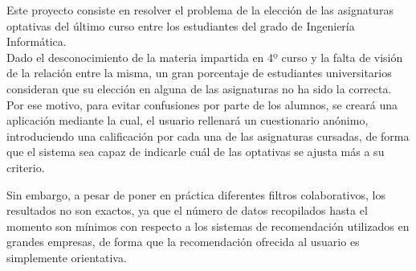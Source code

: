 \newcommand{\grad}{$^{\circ}$}
\nonzeroparskip
Este proyecto consiste en resolver el problema de la elección de las asignaturas optativas del último curso entre los estudiantes del grado de Ingeniería Informática. \\

Dado el desconocimiento de la materia impartida en 4º curso y la falta de visión de la relación entre la misma, un gran porcentaje de estudiantes universitarios consideran que su elección en alguna de las asignaturas no ha sido la correcta. \\

Por ese motivo, para evitar confusiones por parte de los alumnos, se creará una aplicación mediante la cual, el usuario rellenará un  cuestionario anónimo, introduciendo  una calificación por cada una de las asignaturas cursadas, de forma que el sistema sea capaz de indicarle cuál de las optativas se ajusta más a su criterio. 

Sin embargo, a pesar de poner en práctica diferentes filtros colaborativos, los resultados no son exactos, ya que el número de datos recopilados hasta el momento son mínimos con respecto a los sistemas de recomendación utilizados en grandes empresas, de forma que la recomendación ofrecida al usuario es simplemente orientativa. 